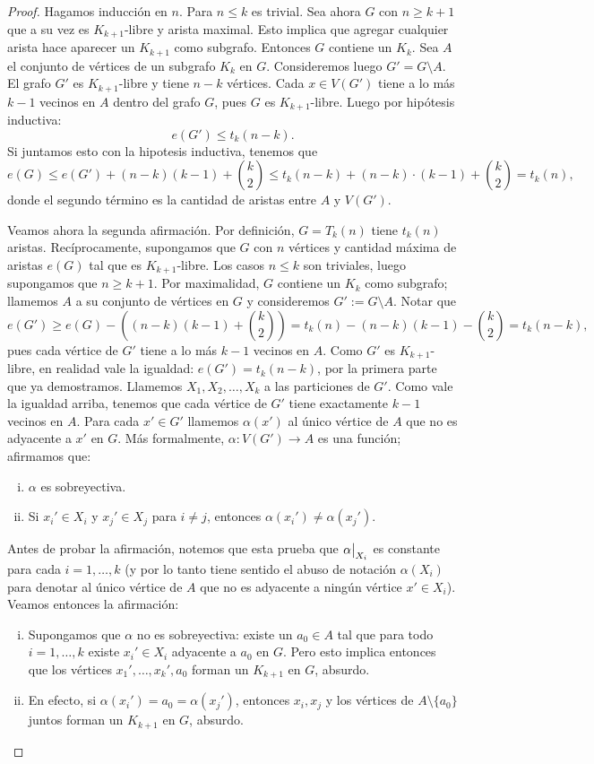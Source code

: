 \documentclass[12pt]{report}
\theoremstyle{plain}
\theoremstyle{definition}
\newcommand\rest[2]{{%
  \left.\kern-\nulldelimiterspace %
  #1 %
  \vphantom{\big|} %
  \right|_{#2} %
  }}
\begin{document}
\begin{proof}
Hagamos inducción en $n$. Para $n \leq k$ es trivial. Sea ahora $G$ con $n \geq k+1$ que a su vez es $K_{k+1}$-libre y arista maximal. Esto implica que agregar cualquier arista hace aparecer un $K_{k+1}$ como subgrafo. Entonces $G$ contiene un $K_{k}$. Sea $A$ el conjunto de vértices de un subgrafo $K_{k}$ en $G$. Consideremos luego $G' = G\setminus A$. El grafo $G'$ es $K_{k+1}$-libre y tiene $n-k$ vértices. Cada $x \in V(G')$ tiene a lo más $k-1$ vecinos en $A$ dentro del grafo $G$, pues $G$ es $K_{k+1}$-libre. Luego por hipótesis inductiva:
\[
    e(G') \leq t_k(n-k).
\]
Si juntamos esto con la hipotesis inductiva, tenemos que
\[
    e(G) \leq e(G') + (n-k) (k-1) + \binom {k} 2    \leq t_k (n-k) + (n-k) \cdot (k-1) + \binom {k} 2 = t_k (n),
\]
donde el segundo término es la cantidad de aristas entre $A$ y $V(G')$.

Veamos ahora la segunda afirmación. Por definición, $G = T_k (n)$ tiene $t_k (n)$ aristas. Recíprocamente, supongamos que $G$ con $n$ vértices y cantidad máxima de aristas $e(G)$ tal que es $K_{k+1}$-libre. Los casos $n \leq k$ son triviales, luego supongamos que $n \geq k+1$. Por maximalidad, $G$ contiene un $K_{k}$ como subgrafo; llamemos $A$ a su conjunto de vértices en $G$ y consideremos $G' := G \setminus A$. Notar que
\[
    e(G') \geq e(G)- \left ( (n-k) (k-1) + \binom {k} 2 \right ) = t_k (n) -(n-k) (k-1) - \binom{k} 2 = t_k(n-k),
\]
pues cada vértice de $G'$ tiene a lo más $k-1$ vecinos en $A$. Como $G'$ es $K_{k+1}$-libre, en realidad vale la igualdad: $e(G') = t_k (n-k)$, por la primera parte que ya demostramos. Llamemos $X_1, X_2, \ldots, X_k$ a las particiones de $G'$. Como vale la igualdad arriba, tenemos que cada vértice de $G'$ tiene exactamente $k-1$ vecinos en $A$. Para cada $x' \in G'$ llamemos $\alpha(x')$ al único vértice de $A$ que no es adyacente a $x'$ en $G$. Más formalmente, $\alpha : V(G') \rightarrow A$ es una función; afirmamos que:
\begin{enumerate}[(i)]
\item $\alpha$ es sobreyectiva.
\item Si $x_i ' \in X_i$ y $x_j ' \in X_j$ para $i \neq j$, entonces $\alpha (x_i') \neq \alpha (x_j')$.
\end{enumerate}
Antes de probar la afirmación, notemos que esta prueba que
$\rest{\alpha}{X_i}$ es constante para cada $i = 1, \ldots, k$ (y por lo tanto tiene sentido el abuso de notación $\alpha (X_i)$ para denotar al único vértice de $A$ que no es adyacente a ningún vértice $x' \in X_i$). Veamos entonces la afirmación:
\begin{enumerate}[(i)]
\item Supongamos que $\alpha$ no es sobreyectiva: existe un $a_0 \in A$ tal que para todo $i = 1, \ldots, k$ existe $x_i ' \in X_i$ adyacente a $a_0$ en $G$. Pero esto implica entonces que los vértices $x_1' , \ldots, x_k ', a_0$ forman un $K_{k+1}$ en $G$, absurdo.
\item En efecto, si $\alpha (x_i ') = a_0 = \alpha (x_j ')$, entonces $x_i, x_j$ y los vértices de $A \setminus \{a_0\}$ juntos forman un $K_{k+1}$ en $G$, absurdo.
\end{enumerate}


\end{proof}
\end{document}
